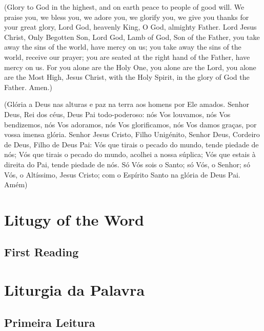 \documentclass[10pt,a5]{article}
\begin{document}
\begin{paracol}{2}

(Glory to God in the highest,
and on earth peace to people
of good will.
We praise you, we bless you,
we adore you, we glorify you,
we give you thanks for your great
glory,
Lord God, heavenly King, O God,
almighty Father.
Lord Jesus Christ, Only Begotten Son,
Lord God, Lamb of God, Son of the
Father,
you take away the sins of the world,
have mercy on us;
you take away the sins of the world,
receive our prayer;
you are seated at the right hand
of the Father, have mercy on us.
For you alone are the Holy One,
you alone are the Lord,
you alone are the Most High,
Jesus Christ, with the Holy Spirit,
in the glory of God the Father. Amen.)

\switchcolumn

(Gl\'oria a Deus nas alturas e paz na terra aos homens por Ele amados.
 Senhor Deus, Rei dos c\'eus, Deus Pai todo-poderoso:
 n\'os Vos louvamos, n\'os Vos bendizemos, n\'os Vos adoramos, n\'os Vos glorificamos,
 n\'os Vos damos graças, por vossa imensa gl\'oria.
 Senhor Jesus Cristo, Filho Unig\'enito, Senhor Deus, Cordeiro de Deus, Filho de Deus Pai:
 V\'os que tirais o pecado do mundo, tende piedade de n\'os;
 V\'os que tirais o pecado do mundo, acolhei a nossa súplica;
 V\'os que estais \`a direita do Pai, tende piedade de n\'os.
 S\'o V\'os sois o Santo;
 s\'o V\'os, o Senhor;
 s\'o V\'os, o Altíssimo, Jesus Cristo;
 com o Espírito Santo na gl\'oria de Deus Pai.
 Am\'em)

 \switchcolumn*

 \section*{Litugy of the Word}

 \subsection*{First Reading}

 \lipsum[3]

 \switchcolumn

 \section*{Liturgia da Palavra}

 \subsection*{Primeira Leitura}

 \lipsum[3]

\end{paracol}


%
\end{document}
